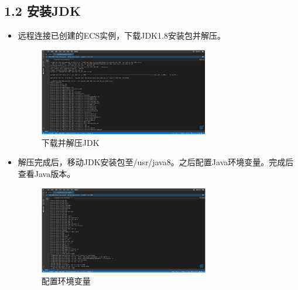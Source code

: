 \documentclass{article}
\begin{document}
\subsection*{1.2 安装JDK}
\begin{itemize}
    \item 远程连接已创建的ECS实例，下载JDK1.8安装包并解压。
          \begin{figure}[H]
              \centering
              \includegraphics[width=0.7\textwidth]{./pic/3.jpg}
              \caption{下载并解压JDK}
          \end{figure}
    \item 解压完成后，移动JDK安装包至/usr/java8。之后配置Java环境变量。完成后查看Java版本。
          \begin{figure}[H]
              \centering
              \includegraphics[width=0.7\textwidth]{./pic/4.jpg}
              \caption{配置环境变量}
          \end{figure}
\end{itemize}
\end{document}
